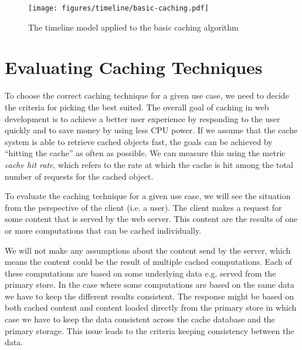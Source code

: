 \begin{figure*}[ht!]
  \centering
  \texttt{[image: figures/timeline/basic-caching.pdf]}
  \caption{The timeline model applied to the basic caching algorithm}
  \label{fig:basic-caching-timeline}
\end{figure*}



\section{Evaluating Caching Techniques}
\label{sec:evaluating_caching_techniques}


To choose the correct caching technique for a given use case, we need to decide the criteria for picking the best suited. The overall goal of caching in web development is to achieve a better user experience by responding to the user quickly and to save money by using less CPU power. If we assume that the cache system is able to retrieve cached objects fast, the goals can be achieved by ``hitting the cache'' as often as possible. We can measure this using the metric \emph{cache hit rate}, which refers to the rate at which the cache is hit among the total number of requests for the cached object.



To evaluate the caching technique for a given use case, we will see the situation from the perspective of the client (i.e. a user). The client makes a request for some content that is served by the web server. This content are the results of one or more computations that can be cached individually.


We will not make any assumptions about the content send by the server, which means the content could be the result of multiple cached computations. Each of these computations are based on some underlying data e.g. served from the primary store. In the case where some computations are based on the same data we have to keep the different results consistent. The response might be based on both cached content and content loaded directly from the primary store in which case we have to keep the data consistent across the cache database and the primary storage. This issue leads to the criteria keeping consistency between the data.

